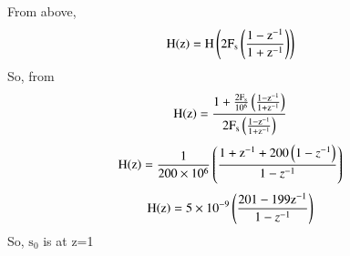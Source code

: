 \documentclass[beamer]{IEEEtran}
\theoremstyle{remark}
\begin{document}
From above,
\begin{align}
\label{1}
    \text{H\ensuremath{\left(\text{z}\right)}}&=\text{H}\left(2\text{F}_\text{s}\left(\frac{1-\text{z}^{-1}}{1+\text{z}^{-1}}\right)\right)
\end{align}
So, from \brak{\ref{1}}
\begin{align}
    \text{H\ensuremath{\left(\text{z}\right)}}&=\frac{1+\frac{2\text{F}_{\text{s}}}{10^6}\left(\frac{1-\text{z}^{-1}}{1+\text{z}^{-1}}\right)}{2\text{F}_{\text{s}}\left(\frac{1-\text{z}^{-1}}{1+\text{z}^{-1}}\right)}
\end{align}
\begin{align}
    \text{H\ensuremath{\left(\text{z}\right)}}&=\frac{1}{200\times10^6}\left(\frac{1+\text{z}^{-1}+200\left(1-z^{-1}\right)}{1-z^{-1}}\right)
\end{align}
\begin{align}
    \text{H\ensuremath{\left(\text{z}\right)}}&=5\times10^{-9}\left(\frac{201-199\text{z}^{-1}}{1-z^{-1}}\right)
\end{align}
So, $\text{s}_0$ is at z=1\\
\end{document}
